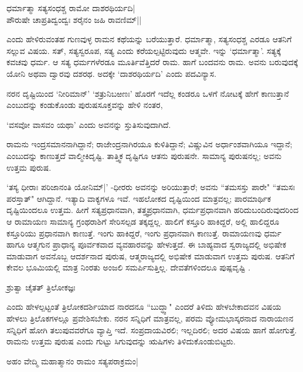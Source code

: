 \begin{shloka}
ಧರ್ಮಾತ್ಮಾ ಸತ್ಯಸಂಧಶ್ಚ ರಾಮೋ ದಾಶರಥಿರ್ಯದಿ|\\
ಪೌರುಷೇ ಚಾಪ್ರತಿದ್ವಂದ್ವಃ ಶರೈನಂ ಜಹಿ ರಾವಣಿಮ್||
\end{shloka}

ಎಂದು ಹೇಳಿರುವಂತಹ ಗುಣವುಳ್ಳ ರಾಮನ ಕಥೆಯನ್ನು ಬರೆಯುತ್ತಾರೆ. ಧರ್ಮಾತ್ಮಾ, ಸತ್ಯಸಂಧಶ್ಚ ಎರಡೂ ಆತನಿಗೆ ಸಲ್ಲುವ ವಿಷಯ. ಸತ್, ಸತ್ಯಸ್ವರೂಪ, ಸತ್ಯ ಎಂದು ಕರೆಯಲ್ಪಟ್ಟಿರುವುದು ಆತ್ಮವೇ. ಇನ್ನು `ಧರ್ಮಾತ್ಮಾ'. ಸತ್ಯಕ್ಕೆ ಕವಚವು ಧರ್ಮ.  ಆ ಸತ್ಯ ಧರ್ಮಗಳೆರಡೂ ಮೂರ್ತಿವೆತ್ತಿದರೆ ರಾಮ. ಹಾಗೆ ಬಂದವನು ರಾಮ. ಅವನು ಬರುವುದಕ್ಕೆ ಯೋನಿ ಅಥವಾ ದ್ವಾರವು ದಶರಥ. ಅದಕ್ಕೇ `ದಾಶರಥಿರ್ಯದಿ' ಎಂದು ಪದವಿನ್ಯಾಸ. 

ನರನ ದೃಷ್ಟಿಯಿಂದ `ನೀರಿಮಾನ್' `ಶತ್ರುನಿಬಱಣಃ' ಹೊರಗೆ ಇದೆಲ್ಲ ಕಂಡರೂ ಒಳಗೆ ನೋಟಕ್ಕೆ ಹೇಗೆ ಕಾಣುತ್ತಾನೆ ಎಂಬುದನ್ನು ಕಂಡುಕೊಂಡು ಪುರುಷಸೂಕ್ತವನ್ನು ಹೇಳಿ ನಂತರ, 

\begin{shloka}
`ವಸವೋ ವಾಸವಂ ಯಥಾ' ಎಂದು ಅವನನ್ನು ಸ್ತುತಿಸುವುದಾಗಿದೆ.
\end{shloka}

ರಾಮನು ಇಂದ್ರಸಮಾನನಾಗಿದ್ದಾನೆ; ರಾಜೇಂದ್ರನಾಗಿರಯೂ ಕುಳಿತಿದ್ದಾನೆ; ವಿಷ್ಣುವಿನ ಅರ್ಧಾಂಶವಾಗಿಯೂ ಇದ್ದಾನೆ; ಎಂಬುದನ್ನು ಕಾಣುತ್ತದೆ ವಾಲ್ಮೀಕಿದೃಷ್ಟಿ. ತಾತ್ತ್ವಿಕ ದೃಷ್ಟಿಗೂ ಆತನು ಪುರುಷನೇ. ಸಾಮಾನ್ಯ ಪುರುಷನಲ್ಲ; ಅವನು ಉತ್ತಮ ಪುರುಷ. 

`ತಸ್ಯ ಧೀರಾಃ ಪರಿಜಾನಂತಿ ಯೋನಿಮ್|' -ಧೀರರು ಅವನನ್ನು ಅರಿಯುತ್ತಾರೆ; ಅವನು ``ತಮಸಸ್ತು ಪಾರೇ" ``ತಮಸಃ ಪರಸ್ತಾತ್" ಆಗಿದ್ದಾನೆ. ಇತ್ಯಾದಿ ವಾಕ್ಯಗಳೂ ಇವೆ. ಇಹಲೋಕದ ದೃಷ್ಟಿಯಿಂದ ಮಾತ್ರವಲ್ಲ; ಪಾರಮಾರ್ಥಿಕ ದೃಷ್ಟಿಯಿಂದಲೂ ಉತ್ತಮ. ಹೀಗೆ ಸತ್ಯಪ್ರಧಾನವಾಗಿ, ತತ್ತ್ವಪ್ರಧಾನವಾಗಿ, ಧರ್ಮಪ್ರಧಾನವಾಗಿ ಹರಿದುಬಂದಿರುವುದರಿಂದ ಆ ರಾಮಾಯಣ ಸಾಮಾನ್ಯ ಗ್ರಂಥರಾಶಿಗೆ ಸೇರಿಸಲ್ಪಡ ತಕ್ಕದ್ದಲ್ಲ. ಹಾಲಿಗೆ ಕಸ್ತೂರಿ ಹಾಕಿದ್ದರೆ, ಅಲ್ಲಿ ಹಾಲಿದ್ದರೂ ಕಸ್ತೂರಿಯು ಪ್ರಧಾನವಾಗಿ ಕಾಣುತ್ತೆ. ಇಂಗು ಹಾಕಿದ್ದರೆ, ಇಂಗು ಪ್ರಧಾನವಾಗಿ ಕಾಣುತ್ತೆ. ರಾಮಾಯಣವು ಧರ್ಮ ಹಾಗೂ ಆತ್ಮಗುನ ಪ್ರಾಧಾನ್ಯ ಪೂರ್ವಕವಾದ ವ್ಯವಹಾರವನ್ನು ಹೇಳುತ್ತದೆ. ಈ ಬಾಹ್ಯವಾದ ಸ್ವರಾಜ್ಯದಲ್ಲಿ ಅಭಿಷೇಕ ಮಾಡುವಾಗ ಅವನೊಬ್ಬ ಆದರ್ಶನಾದ ಪುರುಷ, ಆತ್ಮರಾಜ್ಯದಲ್ಲಿ ಅಭಿಷೇಕ ಮಾಡುವಾಗ ಉತ್ತಮ ಪುರುಷ. ಆತನಿಗೆ ಕೇವಲ ಭೂಮಿಯಲ್ಲಿ ಮಾತ್ರ ನಿಂರತು ಅಂಜಲಿ ಸಮರ್ಪಿಸುತ್ತಿಲ್ಲ. ದೇವತೆಗಳಿಂದಲೂ ಪುಷ್ಪವೃಷ್ಟಿ .

\begin{shloka}
ಶ್ರುತ್ವಾ ಚೈತತ್ ತ್ರಿಲೋಕಜ್ಞಃ
\end{shloka}
ಎಂದು ಹೇಳಲ್ಪಟ್ಟಂತೆ ತ್ರಿಲೋಕದರ್ಶಿಯಾದ ನಾರದನೂ ``ಬುದ್ಧ್ವಾ" ಎಂದರೆ ತಿಳಿದು ಹೇಳಬೇಕಾದವನ ವಿಷಯ ಹೇಳಲು ತ್ರಿಲೊಕಗಳಲ್ಲೂ ಪ್ರವೇಶಿಸಬೇಕು. ನರನ ಸನ್ನಿಧಿಗೆ ಮಾತ್ರವಲ್ಲ, ಪರಮ ವ್ಯೋಮಭಾಸ್ಕರನಾದ ನಾರಾಯಣನ ಸನ್ನಿಧಿಗೆ ಹೋಗಿ ತಲುಪುವವರೆಗೂ ವ್ಯಾಪ್ತಿ ಇದೆ. ಸಂಪ್ರದಾಯವಿರಲಿ; ಇಲ್ಲದಿರಲಿ; ಅದರ ವಿಷಯ ಹಾಗೆ ಹೋಗುತ್ತೆ. ರಾಮನು ಉತ್ತಮ ಪುರುಷ ಎಂದು ಗುಟ್ಟು ಸಿಗುವುದನ್ನು ಋಷಿಗಳು ತಿಳಿದುಕೊಂಡುಬಿಟ್ಟರು.

\begin{shloka}
ಅಹಂ ವೇದ್ಮಿ ಮಹಾತ್ಮಾನಂ ರಾಮಂ ಸತ್ಯಪರಾಕ್ರಮಂ|
\end{shloka}

